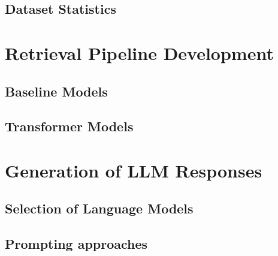 \subsection{Dataset Statistics}


\section{Retrieval Pipeline Development}

\subsection{Baseline Models}

\subsection{Transformer Models}

\section{Generation of LLM Responses}


\subsection{Selection of Language Models}

\subsection{Prompting approaches}
